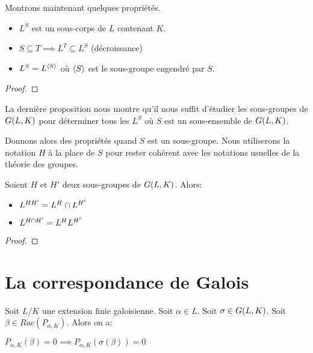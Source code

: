 Montrons maintenant quelques propriétés.

\begin{proposition}
	\begin{itemize}
		\item $L^{S}$ est un sous-corps de $L$ contenant $K$.
		\item $S \subseteq T \implies L^{T} \subseteq L^{S}$ (décroissance)
		\item $L^{S} = L^{\left<S\right>}$ où $\left<S\right>$ est le
			sous-groupe engendré par $S$.
	\end{itemize}
\end{proposition}

\ifdefined\outputproof
\begin{proof}

\end{proof}
\fi

La dernière proposition nous montre qu'il nous suffit d'étudier les sous-groupes
de $G(L, K)$ pour déterminer tous les $L^{S}$ où $S$ est un
sous-ensemble de $G(L, K)$.

Donnons alors des propriétés quand $S$ est un sous-groupe. Nous utiliserons la
notation $H$ à la place de $S$ pour rester cohérent avec les notations usuelles
de la théorie des groupes.

\begin{proposition}
	Soient $H$ et $H'$ deux sous-groupes de $G(L, K)$. Alors:
	\begin{itemize}
		\item $L^{HH'} = L^{H} \cap L^{H'}$
		\item $L^{H \cap H'} = L^{H} L^{H'}$
	\end{itemize}
\end{proposition}

\ifdefined\outputproof
\begin{proof}

\end{proof}
\fi

\section{La correspondance de Galois}

Soit $L/K$ une extension finie galoisienne. Soit $\alpha \in L$.
Soit $\sigma \in G(L, K)$.
Soit $\beta \in Rac(P_{\alpha, K})$.
Alors on a:

$P_{\alpha, K}(\beta) = 0 \implies P_{\alpha, K}(\sigma(\beta)) = 0$

